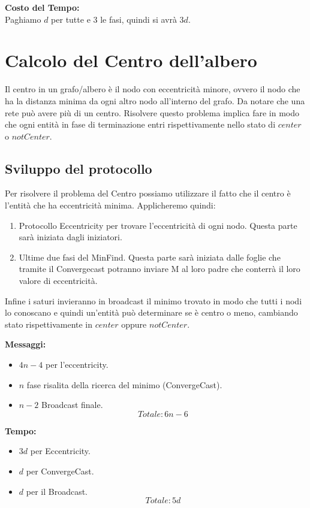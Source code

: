 \textbf{Costo del Tempo:}\\
Paghiamo $d$ per tutte e 3 le fasi, quindi si avrà $3d$.

\section{Calcolo del Centro dell'albero}
Il centro in un grafo/albero è il nodo con eccentricità minore, ovvero il nodo che ha la distanza minima da ogni altro nodo all'interno del grafo. Da notare che una rete può avere più di un centro. Risolvere questo problema implica fare in modo che ogni entità in fase di terminazione entri rispettivamente nello stato di $center$ o $notCenter$.\\
\subsection{Sviluppo del protocollo}
Per risolvere il problema del Centro possiamo utilizzare il fatto che il centro è l'entità che ha eccentricità minima. Applicheremo quindi:
\begin{enumerate}
    \item Protocollo Eccentricity per trovare l'eccentricità di ogni nodo. Questa parte sarà iniziata dagli iniziatori.
    \item Ultime due fasi del MinFind. Questa parte sarà iniziata dalle foglie che tramite il Convergecast potranno inviare M al loro padre che conterrà il loro valore di eccentricità.
\end{enumerate}
Infine i saturi invieranno in broadcast il minimo trovato in modo che tutti i nodi lo conoscano e quindi un'entità può determinare se è centro o meno, cambiando stato rispettivamente in $center$ oppure $notCenter$.

\textbf{Messaggi:}
\begin{itemize}
    \item $4n - 4$ per l'eccentricity.
    \item $n$ fase risalita della ricerca del minimo (ConvergeCast).
    \item $n-2$ Broadcast finale.
$$Totale: 6n -6$$
\end{itemize}
\textbf{Tempo:}
\begin{itemize}
    \item $3d$ per Eccentricity.
    \item $d$ per ConvergeCast.
    \item $d$ per il Broadcast.
    $$Totale: 5d$$
\end{itemize}

